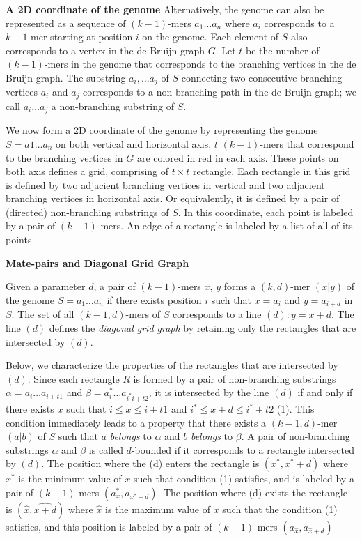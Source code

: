 \documentclass[a4paper]{article}
\begin{document}
\noindent
\textbf{A 2D coordinate of the genome}
Alternatively, the genome can also be represented as a sequence of $(k-1)$-mers $a_1\ldots a_n$ where 
$a_i$ corresponds to a $k-1$-mer starting at position $i$ on the genome. 
Each element of $S$ also corresponds to a vertex in the de Bruijn graph $G$. 
Let $t$ be the number of $(k-1)$-mers in the genome that corresponds to the branching vertices in the
de Bruijn graph. The substring $a_i, \ldots a_j$ of $S$ connecting two consecutive branching 
vertices $a_i$ and $a_j$ corresponds to a non-branching path in the de Bruijn graph; we call 
$a_i\ldots a_j$ a non-branching substring of $S$.

We now form a 2D coordinate of the genome by representing the genome $S=a1\ldots a_n$ on
both vertical and horizontal axis. $t$ $(k-1)$-mers that correspond to the branching vertices 
in $G$ are colored in red in each axis. These points on both axis defines a grid, 
comprising of $t\times t$ rectangle. Each rectangle in this grid is defined by two adjacient branching 
vertices in vertical and two adjacient branching vertices in horizontal axis. 
Or equivalently, it is defined by a pair of (directed) non-branching substrings of $S$.    
In this coordinate, each point is labeled by a pair of $(k-1)$-mers. An edge of a rectangle is labeled 
by a list of all of its points.  

\noindent
\textbf{Mate-pairs and Diagonal Grid Graph}

Given a parameter $d$, a pair of $(k-1)$-mers $x$, $y$ forms a $(k,d)$-mer $(x|y)$  
of the genome $S = a_1\ldots a_n$ if there exists position $i$ such that $x=a_i$ and 
$y = a_{i+d}$ in $S$. The set of all $(k-1,d)$-mers of $S$ corresponds to a line $(d): y = x+d$. The 
line $(d)$ defines the \emph{diagonal grid graph} by retaining only the rectangles that 
are intersected by $(d)$. 

Below, we characterize the properties of the rectangles that are intersected by $(d)$. 
Since each rectangle $R$ is formed by a pair of non-branching substrings $\alpha = a_i\ldots a_{i+t1}$
and $\beta = a_i^*\ldots a_{i^*i+ t2}$, it is intersected by the line $(d)$ if and only if 
there exists $x$ such that $i\leq x \leq i+t1$ and $ i^* \leq x + d \leq i^* + t2$ (1). This condition
immediately leads to a property that there exists a $(k-1,d)$-mer $(a|b)$ of $S$ such that 
$a$ \emph{belongs} to $\alpha$ and $b$ \emph{belongs} to $\beta$.  A pair 
of non-branching substrings $\alpha$ and $\beta$ is called $d$-bounded if it corresponds to 
a rectangle intersected by $(d)$. The position where the (d) enters the rectangle is $(x^*,x^*+d)$ where 
$x^*$ is the minimum value  of $x$ such that condition (1) satisfies, and is labeled by 
a pair of $(k-1)$-mers $(a_x^*, a_{x^*+d})$.  The position where (d) exists 
the rectangle is $(\hat{x}, \hat{x+d})$ where $\hat{x}$ is the maximum value of $x$ such that the condition
(1) satisfies, and this position is labeled by a pair of $(k-1)$-mers $(a_{\hat{x}}, a_{\hat{x} +d})$
\end{document}
